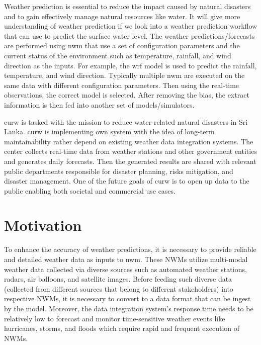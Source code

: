 Weather prediction is essential to reduce the impact caused by natural disasters and to gain effectively manage natural resources like water. It will give more understanding of weather prediction if we look into a weather prediction workflow that can use to predict the surface water level. The weather predictions/forecasts are performed using \acrfull{nwm} that use a set of configuration parameters and the current status of the environment such as temperature, rainfall, and wind direction as the inputs. For example, the \acrfull{wrf} \cite{MesoscaleMicroscaleMeteorologyLaboratoryWeatherModel} model is used to predict the rainfall, temperature, and wind direction. Typically multiple \acrshort{nwm} are executed on the same data with different configuration parameters. Then using the real-time observations, the correct model is selected. After removing the bias, the extract information is then fed into another set of models/simulators. 

\acrfull{curw} \cite{CUrWSL2017SL} is tasked with the mission to reduce water-related natural disasters in Sri Lanka. \acrshort{curw} \cite{CUrWSLObservedSL} is implementing own system with the idea of long-term maintainability rather depend on existing weather data integration systems. The center collects real-time data from weather stations and other government entities and generates daily forecasts. Then the generated results are shared with relevant public departments responsible for disaster planning, risks mitigation, and disaster management. One of the future goals of \acrshort{curw} is to open up data to the public enabling both societal and commercial use cases.

\section{Motivation}
To enhance the accuracy of weather predictions, it is necessary to provide reliable and detailed weather data as inputs to \acrshort{nwm}. These NWMs utilize multi-modal weather data collected via diverse sources such as automated weather stations, radars, air balloons, and satellite images. Before feeding such diverse data (collected from different sources that belong to different stakeholders) into respective NWMs, it is necessary to convert to a data format that can be ingest by the model. Moreover, the data integration system’s response time needs to be relatively low to forecast and monitor time-sensitive weather events like hurricanes, storms, and floods which require rapid and frequent execution of NWMs.

